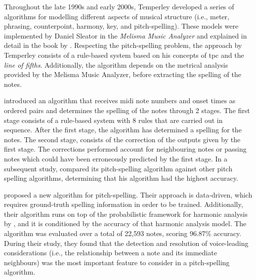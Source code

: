 Throughout the late 1990s and early 2000s, Temperley
developed a series of algorithms for modelling different
aspects of musical structure (i.e., meter, phrasing,
counterpoint, harmony, key, and pitch-spelling). These
models were implemented by Daniel Sleator in the
\emph{Melisma Music Analyzer} and explained in detail in the
book by \textcite{temperley2004cognition}. Respecting the
pitch-spelling problem, the approach by Temperley consists
of a rule-based system based on his concepts of \gls{tpc} and the \emph{line of fifths}.
Additionally, the algorithm depends on the metrical analysis
provided by the Melisma Music Analyzer, before extracting
the spelling of the notes.

\textcite{meredith2003pitch} introduced an algorithm that
receives \gls{midi} note numbers and onset times as ordered pairs
and determines the spelling of the notes through 2 stages.
The first stage consists of a rule-based system with 8 rules
that are carried out in sequence. After the first stage, the
algorithm has determined a spelling for the notes. The
second stage, consists of the correction of the outputs
given by the first stage. The corrections performed account
for neighbouring notes or passing notes which could have
been erroneously predicted by the first stage. In a
subsequent study, \textcite{meredith2005comparing} compared
its pitch-spelling algorithm against other pitch spelling
algorithms, determining that his algorithm had the highest
accuracy.

\textcite{stoddard2004welltempered} proposed a new algorithm
for pitch-spelling. Their approach is data-driven, which
requires ground-truth spelling information in order to be
trained. Additionally, their algorithm runs on top of the
probabilistic framework for harmonic analysis by
\textcite{raphael2003harmonic}, and it is conditioned by the
accuracy of that harmonic analysis model. The algorithm was
evaluated over a total of 22,593 notes, scoring 96.87\%
accuracy. During their study, they found that the detection
and resolution of voice-leading considerations (i.e., the
relationship between a note and its immediate neighbours)
was the most important feature to consider in a
pitch-spelling algorithm.


